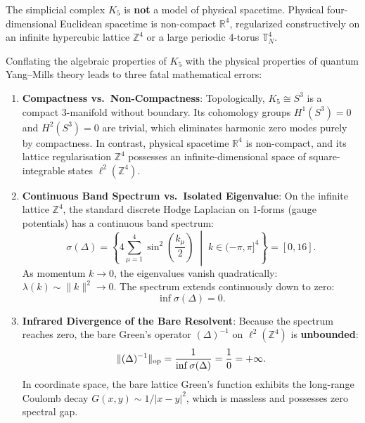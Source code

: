 \begin{warning}
\label{warn:k5_not_spacetime}
The simplicial complex $K_5$ is \textbf{not} a model of physical spacetime. Physical four-dimensional Euclidean spacetime is non-compact $\mathbb{R}^4$, regularized constructively on an infinite hypercubic lattice $\mathbb{Z}^4$ or a large periodic 4-torus $\mathbb{T}_N^4$.

Conflating the algebraic properties of $K_5$ with the physical properties of quantum Yang--Mills theory leads to three fatal mathematical errors:
\begin{enumerate}
    \item \textbf{Compactness vs.\ Non-Compactness}: Topologically, $K_5 \cong S^3$ is a compact 3-manifold without boundary. Its cohomology groups $H^1(S^3) = 0$ and $H^2(S^3) = 0$ are trivial, which eliminates harmonic zero modes purely by compactness. In contrast, physical spacetime $\mathbb{R}^4$ is non-compact, and its lattice regularisation $\mathbb{Z}^4$ possesses an infinite-dimensional space of square-integrable states $\ell^2(\mathbb{Z}^4)$.
    
    \item \textbf{Continuous Band Spectrum vs.\ Isolated Eigenvalue}: On the infinite lattice $\mathbb{Z}^4$, the standard discrete Hodge Laplacian on 1-forms (gauge potentials) has a continuous band spectrum:
    \begin{equation}
    \label{eq:infinite_lattice_spectrum}
    \sigma(\Delta) = \left\{ 4 \sum_{\mu=1}^4 \sin^2\left(\frac{k_\mu}{2}\right) \;\middle|\; k \in (-\pi, \pi]^4 \right\} = [0, 16].
    \end{equation}
    As momentum $k \to 0$, the eigenvalues vanish quadratically: $\lambda(k) \sim \|k\|^2 \to 0$. The spectrum extends continuously down to zero:
    \begin{equation}
    \inf \sigma(\Delta) = 0.
    \end{equation}
    
    \item \textbf{Infrared Divergence of the Bare Resolvent}: Because the spectrum reaches zero, the bare Green's operator $(\Delta)^{-1}$ on $\ell^2(\mathbb{Z}^4)$ is \textbf{unbounded}:
    \begin{equation}
    \label{eq:bare_resolvent_unbounded}
    \|(\Delta)^{-1}\|_{\mathrm{op}} = \frac{1}{\inf \sigma(\Delta)} = \frac{1}{0} = +\infty.
    \end{equation}
    In coordinate space, the bare lattice Green's function exhibits the long-range Coulomb decay $G(x, y) \sim 1/|x - y|^2$, which is massless and possesses zero spectral gap.
    

\end{enumerate}
\end{warning}
